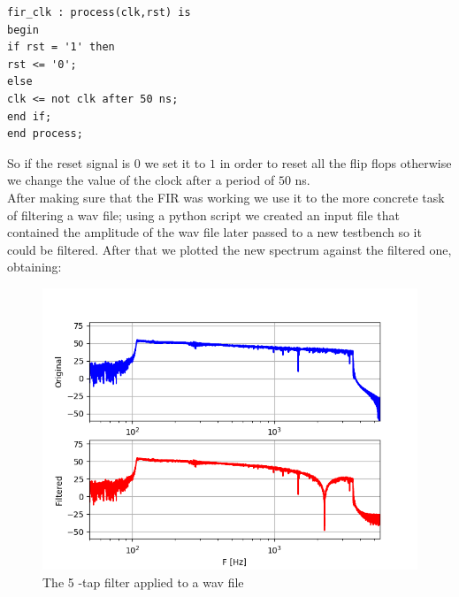 \documentclass[a4paper,12pt]{article}
\begin{document}
\begin{lstlisting}[style=vhdl]
fir_clk : process(clk,rst) is
begin
if rst = '1' then
rst <= '0';
else
clk <= not clk after 50 ns;
end if;
end process;
\end{lstlisting}
So if the reset signal is $0$ we set it to $1$ in order to reset all the flip flops otherwise we change the value of the clock after a period of $50$ ns.\\
After making sure that the FIR was working we use it to the more concrete task of filtering a wav file; using a python script we created an input file that contained the amplitude of the wav file later passed to a new testbench so it could be filtered. After that we plotted the new spectrum against the filtered one, obtaining:
\begin{figure}[h!]
	\begin{flushleft}
		\includegraphics[width=\linewidth,keepaspectratio]{f_spectrum.png}
	\end{flushleft}	
	\caption{The 5 -tap filter applied to a wav file}
	\label{fig:fir5ex}
\end{figure}\\
\end{document}
